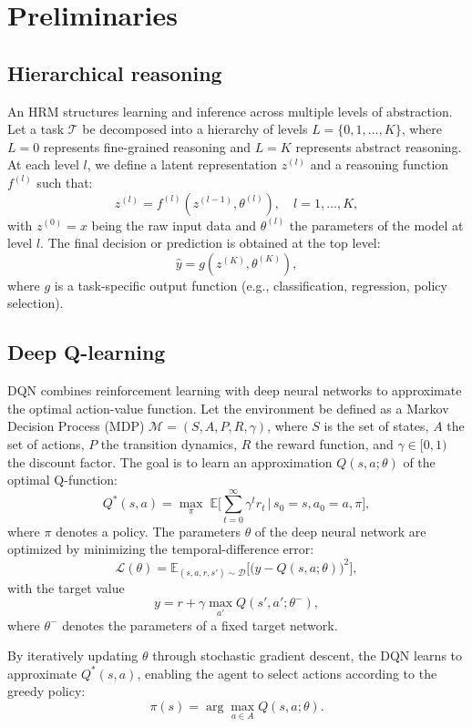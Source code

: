 \documentclass[3p,times,procedia]{elsarticle}
\begin{document}
\section{Preliminaries}
\subsection{Hierarchical reasoning}
An HRM structures learning and inference across multiple levels of abstraction. Let a task $\mathcal{T}$ be decomposed into a 
hierarchy of levels $L = \{0, 1, \dots, K\}$, where $L=0$ represents fine-grained reasoning and $L=K$ represents abstract reasoning. 
At each level $l$, we define a latent representation $z^{(l)}$ and a reasoning function $f^{(l)}$ such that:
\[
z^{(l)} = f^{(l)}(z^{(l-1)}, \theta^{(l)}), \quad l = 1, \dots, K,
\]
with $z^{(0)} = x$ being the raw input data and $\theta^{(l)}$ the parameters of the 
model at level $l$. The final decision or prediction is obtained at the top level:
\[
\hat{y} = g(z^{(K)}, \theta^{(K)}),
\]
where $g$ is a task-specific output function (e.g., classification, regression, 
policy selection).

\subsection{Deep Q-learning}
DQN combines reinforcement learning with deep neural networks to approximate the optimal action-value function. Let the environment be defined as a Markov Decision Process (MDP) $\mathcal{M} = (S, A, P, R, \gamma)$, where $S$ is the set of states, $A$ the set of actions, $P$ the transition dynamics, $R$ the reward function, and $\gamma \in [0,1)$ the discount factor. The goal is to learn an approximation $Q(s,a;\theta)$ of the optimal Q-function:
\[
Q^*(s,a) = \max_{\pi} \; \mathbb{E}\Big[ \sum_{t=0}^{\infty} \gamma^t r_t \,\big|\, s_0 = s, a_0 = a, \pi \Big],
\]
where $\pi$ denotes a policy. The parameters $\theta$ of the deep neural network 
are optimized by minimizing the temporal-difference error:
\[
\mathcal{L}(\theta) = \mathbb{E}_{(s,a,r,s') \sim \mathcal{D}} \Big[ \big( y - Q(s,a;\theta) \big)^2 \Big],
\]
with the target value 
\[
y = r + \gamma \max_{a'} Q(s',a'; \theta^{-}),
\]
where $\theta^{-}$ denotes the parameters of a fixed target network. 

By iteratively updating $\theta$ through stochastic gradient descent, the DQN learns to approximate $Q^*(s,a)$, enabling the agent to select actions according to the greedy policy:
\[
\pi(s) = \arg\max_{a \in A} Q(s,a;\theta).
\]
\end{document}
